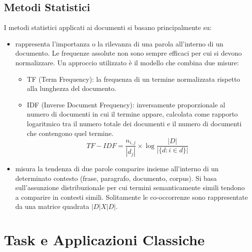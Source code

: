 
\subsection{Metodi Statistici}

I metodi statistici applicati ai documenti si basano principalmente su: 

\begin{itemize}
  \item {} rappresenta l'importanza o la rilevanza di una parola all'interno di un documento. Le frequenze assolute non sono sempre efficaci per cui si devono normalizzare. Un approccio utilizzato è il modello  che combina due misure:
    \begin{itemize}
      \item TF (Term Frequency): la frequenza di un termine normalizzata rispetto alla lunghezza del documento. 
      \item IDF (Inverse Document Frequency): inversamente proporzionale al numero di documenti in cui il termine appare, calcolata come rapporto logaritmico tra il numero totale dei documenti e il numero di documenti che contengono quel termine. 
        $$TF\!-\!IDF = \frac{n_{i,j}}{|d_j|} \times \log \frac{|D|}{|\{d : i \in d\}|}
$$
    \end{itemize}
  \item {} misura la tendenza di due parole comparire insieme all'interno di un determinato contesto (frase, paragrafo, documento, corpus). Si basa sull'assunzione distribuzionale per cui termini semanticamente simili tendono a comparire in contesti simili. Solitamente le co-occorrenze sono rappresentate da una matrice quadrata $|D| X |D|$.
\end{itemize}

\section{Task e Applicazioni Classiche}

